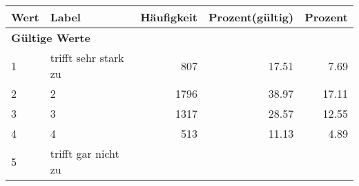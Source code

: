      \begin{longtable}{lXrrr}
     \toprule
     \textbf{Wert} & \textbf{Label} & \textbf{Häufigkeit} & \textbf{Prozent(gültig)} & \textbf{Prozent} \\
     \endhead
     \midrule
     \multicolumn{5}{l}{\textbf{Gültige Werte}}\\

     1 &
     \multicolumn{1}{X}{ trifft sehr stark zu   } &


       \num{807} &
       \num[round-mode=places,round-precision=2]{17.51} &
         \num[round-mode=places,round-precision=2]{7.69} \\

     2 &
     \multicolumn{1}{X}{ 2   } &


       \num{1796} &
       \num[round-mode=places,round-precision=2]{38.97} &
         \num[round-mode=places,round-precision=2]{17.11} \\

     3 &
     \multicolumn{1}{X}{ 3   } &


       \num{1317} &
       \num[round-mode=places,round-precision=2]{28.57} &
         \num[round-mode=places,round-precision=2]{12.55} \\

     4 &
     \multicolumn{1}{X}{ 4   } &


       \num{513} &
       \num[round-mode=places,round-precision=2]{11.13} &
         \num[round-mode=places,round-precision=2]{4.89} \\

     5 &
     \multicolumn{1}{X}{ trifft gar nicht zu   } &



\end{longtable}
